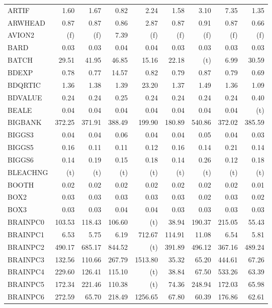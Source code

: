 \documentclass[11pt,twoside]{article}
\begin{document}
{\begin{longtable}[c]{|l|r|r|r|r|r|r|r|r|}
ARTIF & 1.60 & 1.67 & 0.82 & 2.24 & 1.58 & 3.10 & 7.35 & 1.35 \\
ARWHEAD & 0.87 & 0.87 & 0.86 & 2.87 & 0.87 & 0.91 & 0.87 & 0.66 \\
AVION2 & (f) & (f) & 7.39 & (f) & (f) & (f) & (f) & (f) \\
BARD & 0.03 & 0.03 & 0.04 & 0.04 & 0.03 & 0.03 & 0.03 & 0.03 \\
BATCH & 29.51 & 41.95 & 46.85 & 15.16 & 22.18 & (t) & 6.99 & 30.59 \\
BDEXP & 0.78 & 0.77 & 14.57 & 0.82 & 0.79 & 0.87 & 0.79 & 0.69 \\
BDQRTIC & 1.36 & 1.38 & 1.39 & 23.20 & 1.37 & 1.49 & 1.36 & 1.09 \\
BDVALUE & 0.24 & 0.24 & 0.25 & 0.24 & 0.24 & 0.24 & 0.24 & 0.40 \\
BEALE & 0.04 & 0.04 & 0.04 & 0.04 & 0.04 & 0.04 & 0.04 & (t) \\
BIGBANK & 372.25 & 371.91 & 388.49 & 199.90 & 180.89 & 540.86 & 372.02 & 385.59 \\
BIGGS3 & 0.04 & 0.04 & 0.06 & 0.04 & 0.04 & 0.05 & 0.04 & 0.03 \\
BIGGS5 & 0.16 & 0.11 & 0.11 & 0.12 & 0.16 & 0.14 & 0.21 & 0.14 \\
BIGGS6 & 0.14 & 0.19 & 0.15 & 0.18 & 0.14 & 0.26 & 0.12 & 0.18 \\
BLEACHNG & (t) & (t) & (t) & (t) & (t) & (t) & (t) & (t) \\
BOOTH & 0.02 & 0.02 & 0.02 & 0.02 & 0.02 & 0.02 & 0.02 & 0.01 \\
BOX2 & 0.03 & 0.03 & 0.03 & 0.03 & 0.03 & 0.02 & 0.03 & 0.02 \\
BOX3 & 0.03 & 0.03 & 0.04 & 0.04 & 0.03 & 0.03 & 0.03 & 0.03 \\
BRAINPC0 & 103.53 & 118.43 & 106.60 & (t) & 38.94 & 190.37 & 215.05 & 55.43 \\
BRAINPC1 & 6.53 & 5.75 & 6.19 & 712.67 & 114.91 & 11.08 & 6.54 & 5.81 \\
BRAINPC2 & 490.17 & 685.17 & 844.52 & (t) & 391.89 & 496.12 & 367.16 & 489.24 \\
BRAINPC3 & 132.56 & 110.66 & 267.79 & 1513.80 & 35.32 & 65.20 & 444.61 & 67.26 \\
BRAINPC4 & 229.60 & 126.41 & 115.10 & (t) & 38.84 & 67.50 & 533.26 & 63.39 \\
BRAINPC5 & 172.34 & 221.46 & 110.38 & (t) & 74.36 & 248.94 & 172.03 & 65.98 \\
BRAINPC6 & 272.59 & 65.70 & 218.49 & 1256.65 & 67.80 & 60.39 & 176.86 & 62.61 \\

\end{longtable}}
\end{document}
